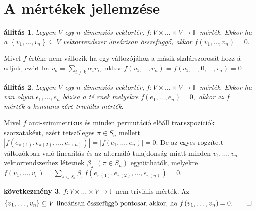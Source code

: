 \documentclass[9pt, a4paper, showtrims]{memoir}
\makeatletter
\renewenvironment{proof}[1][\proofname]
    {\par\pushQED{\qed}%
    \normalfont \topsep6\p@\@plus6\p@\relax
    \trivlist
    \item[\hskip\labelsep
        \itshape
    #1\@addpunct{:}]\ignorespaces}
    {\popQED\endtrivlist\@endpefalse}
\theoremstyle{plain}
\newtheorem{proposition}{állítás}[chapter]
\theoremstyle{remark}
\theoremstyle{definition}
\newtheorem{corollary}[proposition]{következmény}
\makeatother
\begin{document}
\section{A mértékek jellemzése}

\begin{proposition}
Legyen $V$ egy $n$-dimenziós vektortér, $f:V\times \ldots \times
V\rightarrow \mathbb{F}$ mérték. Ekkor ha a $\left\{ v_{1},\ldots ,v_{n}\right\}
\subseteq V$ vektorrendszer lineárisan összefüggő, akkor 
\(
f\left( v_{1},\ldots ,v_{n}\right) =0.
\)
\end{proposition}

\begin{proof}
Mivel $f$ értéke nem változik ha egy változójához a másik skalárszorosát hozz%
á adjuk, ezért ha $v_{k}=\sum_{i\neq k}\alpha _{i}v_{i},$ akkor $f\left(
v_{1},\ldots ,v_{n}\right) =f\left( v_{1},\ldots ,0,\ldots ,v_{n}\right) =0.$
\end{proof}

\begin{proposition}
Legyen $V$ egy $n$-dimenziós vektortér, $f:V\times \ldots \times
V\rightarrow \mathbb{F}$ mérték. Ekkor ha van olyan $e_{1},\ldots ,e_{n}$ bázisa a té%
rnek melyekre 
\(
f\left( e_{1},\ldots ,e_{n}\right) =0,
\)
akkor az $f$ mérték a konstans zéró triviális mérték.
\end{proposition}

\begin{proof}
Mivel $f$ anti-szimmetrikus és minden permutáció előáll transzpozíciók
szorzataként, ezért tetszőleges $\pi \in S_{n}$ mellett $\left| f\left(
e_{\pi \left( 1\right) },e_{\pi \left( 2\right) },\ldots ,e_{\pi \left(
n\right) }\right) \right| =\left| f\left( e_{1},\ldots ,e_{n}\right) \right|
=0.$ De az egyes rögzített változókban való linearitás és az alternáló
tulajdonság miatt minden $v_{1},\ldots ,v_{n}$ vektorrendszerhez léteznek $%
\beta _{\pi }$ $\left( \pi \in S_{n}\right) $ együtthatók, melyekre $f\left(
v_{1},\ldots ,v_{n}\right) =\sum_{\pi \in S_{n}}\beta _{\pi }f\left( e_{\pi
\left( 1\right) },e_{\pi \left( 2\right) },\ldots ,e_{\pi \left( n\right)
}\right) =0.$
\end{proof}

\begin{corollary}
$f:V\times \ldots \times V\rightarrow \mathbb{F}$ nem triviális mérték. Az 
\[
\left\{ v_{1},\ldots ,v_{n}\right\} \subseteq V%
\text{ lineárisan összefüggő pontosan akkor, ha }f\left( v_{1},\ldots
,v_{n}\right) =0.\qedhere
\]
\end{corollary}
\end{document}
